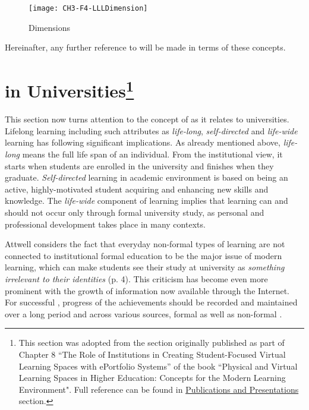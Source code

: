 \begin{figure}[htb]
\centering
\texttt{[image: CH3-F4-LLLDimension]}
\caption{\LLLc Dimensions}
\label{fig:llldim}
\end{figure}

\FloatBarrier

Hereinafter, any further reference to \LLLs will be made in terms of these
concepts.

\section[\LLLc in Universities]{\LLLc in Universities\footnote{This section was
adopted from the section originally published as part of Chapter 8 ``The Role of
Institutions in Creating Student-Focused Virtual Learning Spaces with ePortfolio
Systems'' of the book ``Physical and Virtual Learning Spaces in Higher
Education: Concepts for the Modern Learning Environment". Full reference can be
found in \hyperref[sec:pub]{Publications and Presentations} section.} }

\label{sec:uni}

This section now turns attention to the concept of \LLLs as it relates to
universities. Lifelong learning including such attributes as \textit{life-long},
\textit{self-directed} and \textit{life-wide} learning has following significant
implications. As already mentioned above, \textit{life-long} means the full life
span of an individual. From the institutional view, it starts when students are
enrolled in the university and finishes when they graduate.
\textit{Self-directed} learning in academic environment is based on being an
active, highly-motivated student acquiring and enhancing new skills and
knowledge. The \textit{life-wide} component of learning implies that learning
can and should not occur only through formal university study, as personal and
professional development takes place in many contexts. 

Attwell \citeyearpar{Attwell2007} considers the fact that everyday non-formal
types of learning are not connected to institutional formal education to be the
major issue of modern learning, which can make students see their study at
university as \textit{something irrelevant to their identities} (p. 4). This
criticism has become even more prominent with the growth of information now
available through the Internet. For successful \LLLsn, progress of the
achievements should be recorded and maintained over a long period and across
various sources, formal as well as non-formal \citep{Kay2008}.

